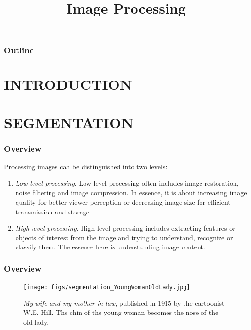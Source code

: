 
\title{Image Processing}
\begin{frame}[plain]\logoTechTower
	\titlepage
\end{frame}

\begin{frame}
\frametitle{Outline}
\logoCSIPCPL\logoTechTower
	\setcounter{tocdepth}{1}	
	\tableofcontents
\end{frame}


\section{INTRODUCTION}

\section{SEGMENTATION}

\begin{frame}
\frametitle{Overview}
\logoCSIPCPL\mypagenum
	Processing images can be distinguished into two levels:

	\begin{enumerate}
		\item \emph{Low level processing}.  Low level processing often includes image restoration, noise filtering and image compression.  In essence, it is about increasing image quality for better viewer perception or decreasing image size for efficient transmission and storage.  
		\item \emph{High level processing}.   High level processing includes extracting features or objects of interest from the image and trying to understand, recognize or classify them. The essence here is understanding image content.
	\end{enumerate}
\end{frame}



\begin{frame}
\frametitle{Overview}
\logoCSIPCPL\mypagenum
	\begin{figure}[!htp]
		\texttt{[image: figs/segmentation\_YoungWomanOldLady.jpg]}
		\caption{\emph{My wife and my mother-in-law}, published in 1915 by the cartoonist W.E. Hill.  The chin of the young woman becomes the nose of the old lady. } 
		\label{fig:YoungWomanOldLady}
	\end{figure}
\end{frame}





